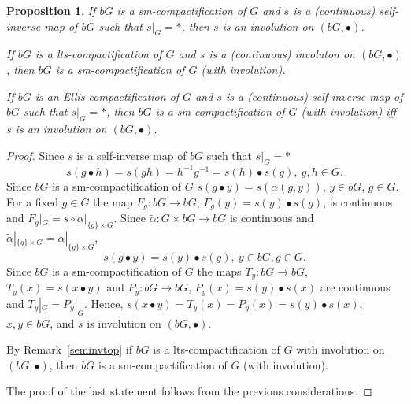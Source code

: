 \documentclass{amsart}
\newtheorem{pro}[thm]{Proposition}
\begin{document}
\begin{pro}\label{ssaieqinv}
If $b G$ is a sm-compactification of $G$ and $s$ is a {\rm(}continuous{\rm)} self-inverse map of $b G$ such that $s|_{G}=*$, then $s$ is an involution on $(b G, \bullet)$. 

If $b G$ is a lts-compactification of $G$ and $s$ is a {\rm(}continuous{\rm)} involuton on $(b G, \bullet)$, then $b G$ is a sm-compactification of $G$ {\rm(}with involution{\rm)}.

If $b G$ is an Ellis compactification of $G$ and $s$ is a {\rm(}continuous{\rm)} self-inverse map of $b G$ such that $s|_{G}=*$, then $b G$ is a sm-compactification of $G$ {\rm(}with involution{\rm)} iff $s$ is an involution on $(b G, \bullet)$.
\end{pro}

\begin{proof}
Since $s$ is a self-inverse map of $b G$ such that $s|_{G}=*$ 
$$s(g\bullet h)=s(gh)=h^{-1}g^{-1}=s(h)\bullet s(g),\ g, h\in G.$$
Since $b G$ is a sm-compactification of $G$ $s(g\bullet y)=s(\tilde\alpha (g, y))$, $y\in b G$, $g\in G$. 
For a fixed $g\in G$ the map $F_g: b G\to b G$, $F_g (y)=s(y)\bullet s(g)$, is continuous and $F_g|_G=s\circ \alpha|_{\{g\}\times G}$. Since $\tilde\alpha: G\times b G\to b G$ is continuous and $\tilde\alpha|_{\{g\}\times G}= \alpha|_{\{g\}\times G}$, 
$$s(g\bullet y)=s(y)\bullet s(g),\ y\in b G, g\in G.$$
Since $b G$ is a sm-compactification of $G$  the maps $T_y: b G\to b G$, $T_y(x)=s(x\bullet y)$ and $P_y: b G\to b G$, $P_y(x)=s(y)\bullet s(x)$ are  continuous and $T_y|_G=P_y|_G$. Hence, $s(x\bullet y)=T_y (x)=P_y (x)=s(y)\bullet s(x)$, $x, y\in b G$, and $s$ is involution on $(b G, \bullet)$. 

\medskip

By Remark~\ref{seminvtop} if $b G$ is a lts-compactification of $G$ with involution on $(b G, \bullet)$, then $b G$ is a sm-compactification of $G$ (with involution).

\medskip

The proof of the last statement follows from the previous considerations.
\end{proof}
\end{document}
